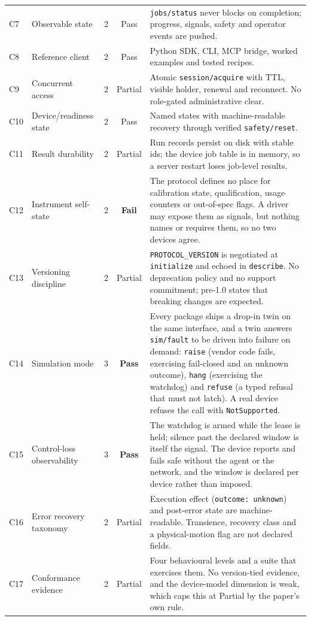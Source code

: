 \begin{table}[p]
\begin{tabular}{@{}llcc p{6.6cm}@{}}
C7  & Observable state         & 2 & Pass    & \texttt{jobs/status} never blocks on completion; progress, signals, safety and operator events are pushed. \\
C8  & Reference client         & 2 & Pass    & Python SDK, CLI, MCP bridge, worked examples and tested recipes. \\
C9  & Concurrent access        & 2 & Partial & Atomic \texttt{session/acquire} with TTL, visible holder, renewal and reconnect. No role-gated administrative clear. \\
C10 & Device/readiness state   & 2 & Pass    & Named states with machine-readable recovery through verified \texttt{safety/reset}. \\
C11 & Result durability        & 2 & Partial & Run records persist on disk with stable ids; the device job table is in memory, so a server restart loses job-level results. \\
C12 & Instrument self-state    & 2 & \textbf{Fail} & The protocol defines no place for calibration state, qualification, usage counters or out-of-spec flags. A driver may expose them as signals, but nothing names or requires them, so no two devices agree. \\
C13 & Versioning discipline    & 2 & Partial & \texttt{PROTOCOL\_VERSION} is negotiated at \texttt{initialize} and echoed in \texttt{describe}. No deprecation policy and no support commitment; pre-1.0 states that breaking changes are expected. \\
C14 & Simulation mode          & 3 & \textbf{Pass} & Every package ships a drop-in twin on the same interface, and a twin answers \texttt{sim/fault} to be driven into failure on demand: \texttt{raise} (vendor code fails, exercising fail-closed and an unknown outcome), \texttt{hang} (exercising the watchdog) and \texttt{refuse} (a typed refusal that must not latch). A real device refuses the call with \texttt{NotSupported}. \\
C15 & Control-loss observability & 3 & \textbf{Pass} & The watchdog is armed while the lease is held; silence past the declared window is itself the signal. The device reports and fails safe without the agent or the network, and the window is declared per device rather than imposed. \\
C16 & Error recovery taxonomy  & 2 & Partial & Execution effect (\texttt{outcome: unknown}) and post-error state are machine-readable. Transience, recovery class and a physical-motion flag are not declared fields. \\
C17 & Conformance evidence     & 2 & Partial & Four behavioural levels and a suite that exercises them. No version-tied evidence, and the device-model dimension is weak, which caps this at Partial by the paper's own rule. \\

\end{tabular}
\end{table}
